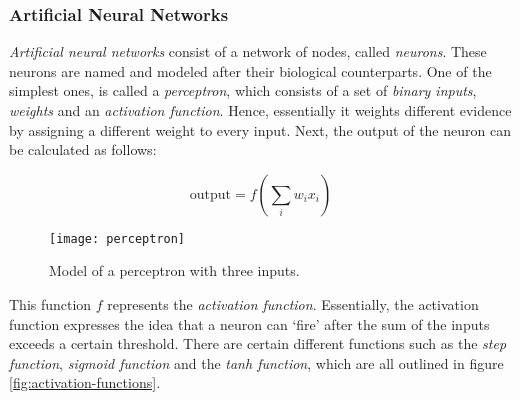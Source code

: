 \subsubsection{Artificial Neural Networks}

\textit{Artificial neural networks} consist of a network of nodes, called \textit{neurons}.
These neurons are named and modeled after their biological counterparts.
One of the simplest ones, is called a \textit{perceptron}, which consists of a set of \textit{binary inputs}, \textit{weights} and an \textit{activation function}.
Hence, essentially it weights different evidence by assigning a different weight to every input.
Next, the output of the neuron can be calculated as follows:

$$\text{output} = f(\sum_{i} w_i x_i)$$

\newpage

\begin{figure}[h]
  \centering
  \texttt{[image: perceptron]}
  \caption{Model of a perceptron with three inputs.}
  \label{fig:perceptron}
\end{figure}

This function $f$ represents the \textit{activation function}.
Essentially, the activation function expresses the idea that a neuron can `fire' after the sum of the inputs exceeds a certain threshold.
There are certain different functions such as the \textit{step function}, \textit{sigmoid function} and the \textit{tanh function},
which are all outlined in figure \ref{fig:activation-functions}.

